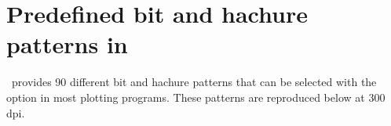 %
%
\chapter{Predefined bit and hachure patterns in \gmt}
\thispagestyle{headings}

\GMT\ provides 90 different bit and hachure patterns that can be
selected with the  option in most plotting programs.
These patterns are reproduced below at 300 dpi.

\begin{center}
\end{center}
